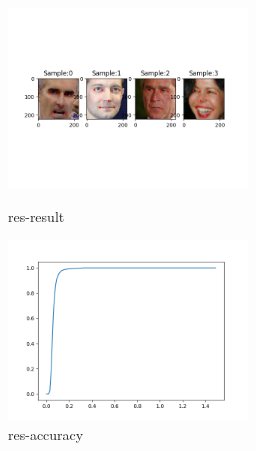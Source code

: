 \documentclass{article}
\begin{document}
\begin{figure}[h]
	\begin{minipage}[t]{0.5\linewidth}
		\centering
		\includegraphics[width=2.5in]{resresult.png}
		\caption{res-result}
	\end{minipage}%
	\begin{minipage}[t]{0.5\linewidth}
		\centering
		\includegraphics[width=2.5in]{resradius.png}
		\caption{res-accuracy}
	\end{minipage}
\end{figure}



\end{document}
